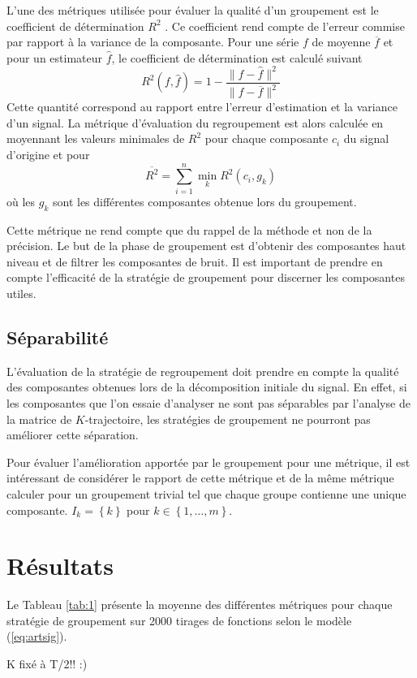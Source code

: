 \documentclass{gretsi}
\newcommand{\set}[1]{\left \{ 1, \dots, #1 \right \}}
\begin{document}
    L'une des métriques utilisée pour évaluer la qualité d'un groupement est le coefficient de détermination $R^2$ \cite{abalov_14_auto}. Ce coefficient rend compte de l'erreur commise par rapport à la variance de la composante. Pour une série $f$ de moyenne $\overline f$ et pour un estimateur $\widehat f$, le coefficient de détermination est calculé suivant
    $$
        R^2(f, \widehat f) = 1 - \frac{\|f-\widehat f\|^2}{\|f-\overline f\|^2}
    $$Cette quantité correspond au rapport entre l'erreur d'estimation et la variance d'un signal. La métrique d'évaluation du regroupement est alors calculée en moyennant les valeurs minimales de $R^2$ pour chaque composante $c_i$ du signal d'origine et pour 
    $$
        \overline{ R^2} = \sum_{i=1}^n \min_k R^2(c_i, g_k)
    $$où les $g_k$ sont les différentes composantes obtenue lors du groupement.
    
    Cette métrique ne rend compte que du rappel de la méthode et non de la précision. Le but de la phase de groupement est d'obtenir des composantes haut niveau et de filtrer les composantes de bruit. Il est important de prendre en compte l'efficacité de la stratégie de groupement pour discerner les composantes utiles.


\subsection{Séparabilité}
\label{sub:sep}
    L'évaluation de la stratégie de regroupement doit prendre en compte la qualité des composantes obtenues lors de la décomposition initiale du signal. En effet, si les composantes que l'on essaie d'analyser ne sont pas séparables par l'analyse de la matrice de $K$-trajectoire, les stratégies de groupement ne pourront pas améliorer cette séparation.
    
       
   Pour évaluer l'amélioration apportée par le groupement pour une métrique, il est intéressant de considérer le rapport de cette métrique et de la même métrique calculer pour un groupement trivial tel que chaque groupe contienne une unique composante. $I_k = \left \{ k \right \}$ pour $k \in \set{m}$.

\section{Résultats}
\label{sec:res}
Le Tableau \ref{tab:1} présente la moyenne des différentes métriques pour chaque stratégie de groupement sur 2000 tirages de fonctions selon le modèle (\ref{eq:artsig}).

K fixé à T/2!! :)

 
{}
\end{document}
